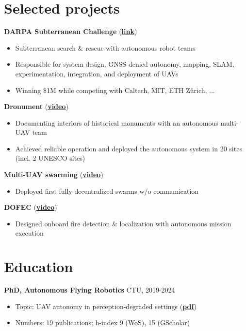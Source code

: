 \documentclass[12pt,a4paper]{article}
\newcommand\Colorhreff[3][reff]{\href{#2}{\color{#1}#3}}
\begin{document}
\begin{paracol}{2}
\section*{Selected projects}

\noindent
\textbf{DARPA Subterranean Challenge} (\Colorhreff{http://mrs.fel.cvut.cz/projects/darpa}{\textbf{link}})
\begin{itemize}
  \item Subterranean search \& rescue with autonomous robot teams
  \item Responsible for system design, GNSS-denied autonomy, mapping, SLAM, experimentation, integration, and deployment of UAVs
  \item Winning \$1M while competing with Caltech, MIT, ETH Zürich, ... 
\end{itemize}

\vspace{0.2cm}
\noindent
\textbf{Dronument} (\Colorhreff{https://www.youtube.com/watch?v=Gx-mBklSbYc}{\textbf{video}})
\begin{itemize}
    \item Documenting interiors of historical monuments with an autonomous multi-UAV team
    \item Achieved reliable operation and deployed the autonomous system in 20 sites (incl. 2 UNESCO sites)
\end{itemize}

\vspace{0.2cm}
\noindent
\textbf{Multi-UAV swarming} (\Colorhreff{https://www.youtube.com/watch?v=Ax3ONfo1hMA}{\textbf{video}})
\begin{itemize}
    \item Deployed first fully-decentralized swarms w/o communication
\end{itemize}

\vspace{0.2cm}
\noindent
\textbf{DOFEC} (\Colorhreff{https://www.youtube.com/watch?v=QHpifXJzH5g}{\textbf{video}})
\begin{itemize}
    \item Designed onboard fire detection \& localization with autonomous mission execution
\end{itemize}

\section*{Education}
\textbf{PhD, Autonomous Flying Robotics} \hfill CTU, 2019-2024
\begin{itemize}
  \item Topic: UAV autonomy in perception-degraded settings (\Colorhreff{https://mrs.fel.cvut.cz/data/papers/petracek_phd_thesis.pdf}{\textbf{pdf}})
  \item Numbers: 19 publications; h-index 9 (WoS), 15 (GScholar)
\end{itemize}


\end{paracol}
\end{document}
